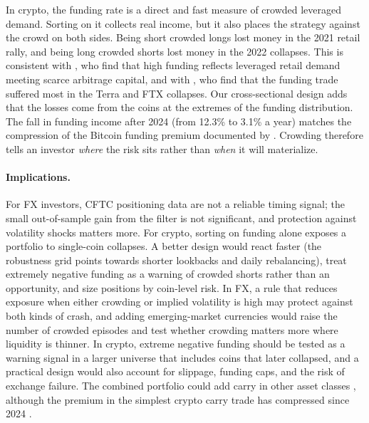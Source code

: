 \documentclass[11pt]{article}
\begin{document}
In crypto, the funding rate is a direct and fast measure of crowded leveraged demand. Sorting on it collects real income, but it also places the strategy against the crowd on both sides. Being short crowded longs lost money in the 2021 retail rally, and being long crowded shorts lost money in the 2022 collapses. This is consistent with \citet{Schmeling2025}, who find that high funding reflects leveraged retail demand meeting scarce arbitrage capital, and with \citet{Christin2023}, who find that the funding trade suffered most in the Terra and FTX collapses. Our cross-sectional design adds that the losses come from the coins at the extremes of the funding distribution. The fall in funding income after 2024 (from 12.3\% to 3.1\% a year) matches the compression of the Bitcoin funding premium documented by \citet{Borri2025}. Crowding therefore tells an investor \emph{where} the risk sits rather than \emph{when} it will materialize.

\paragraph{Implications.}
For FX investors, CFTC positioning data are not a reliable timing signal; the small out-of-sample gain from the filter is not significant, and protection against volatility shocks matters more. For crypto, sorting on funding alone exposes a portfolio to single-coin collapses. A better design would react faster (the robustness grid points towards shorter lookbacks and daily rebalancing), treat extremely negative funding as a warning of crowded shorts rather than an opportunity, and size positions by coin-level risk. In FX, a rule that reduces exposure when either crowding or implied volatility is high may protect against both kinds of crash, and adding emerging-market currencies would raise the number of crowded episodes and test whether crowding matters more where liquidity is thinner. In crypto, extreme negative funding should be tested as a warning signal in a larger universe that includes coins that later collapsed, and a practical design would also account for slippage, funding caps, and the risk of exchange failure. The combined portfolio could add carry in other asset classes \citep{Koijen2018}, although the premium in the simplest crypto carry trade has compressed since 2024 \citep{Borri2025}.
\end{document}
